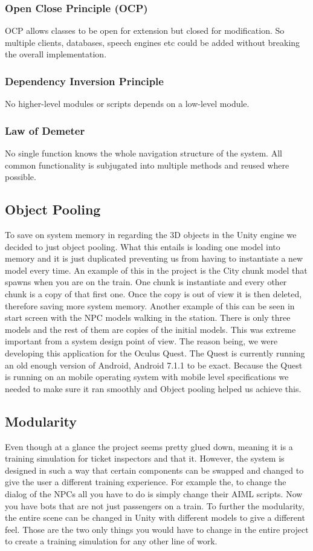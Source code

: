 \subsubsection{Open Close Principle (OCP)}
OCP allows classes to be open for extension but closed for modification. So multiple clients, databases, speech engines etc could be added without breaking the overall implementation.

\subsubsection{Dependency Inversion Principle}
No higher-level modules or scripts depends on a low-level module. 

\subsubsection{Law of Demeter}
No single function knows the whole navigation structure of the system. All common functionality is subjugated into multiple methods and reused where possible.

\subsection{Object Pooling}
To save on system memory in regarding the 3D objects in the Unity engine we decided to just object pooling. What this entails is loading one model into memory and it is just duplicated preventing us from having to instantiate a new model every time. An example of this in the project is the City chunk model that spawns when you are on the train. One chunk is instantiate and every other chunk is a copy of that first one. Once the copy is out of view it is then deleted, therefore saving more system memory. Another example of this can be seen in start screen with the NPC models walking in the station. There is only three models and the rest of them are copies of the initial models. This was extreme important from a system design point of view. The reason being, we were developing this application for the Oculus Quest. The Quest is currently running an old enough version of Android, Android 7.1.1 to be exact. Because the Quest is running on an mobile operating system with mobile level specifications we needed to make sure it ran smoothly and Object pooling helped us achieve this.

\subsection{Modularity}
Even though at a glance the project seems pretty glued down, meaning it is a training simulation for ticket inspectors and that it. However, the system is designed in such a way that certain components can be swapped and changed to give the user a different training experience. For example the, to change the dialog of the NPCs all you have to do is simply change their AIML scripts. Now you have bots that are not just passengers on a train. To further the modularity, the entire scene can be changed in Unity with different models to give a different feel. Those are the two only things you would have to change in the entire project to create a training simulation for any other line of work.

